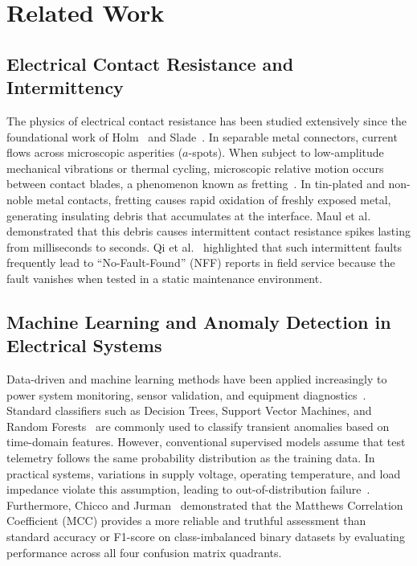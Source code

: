 \documentclass[conference]{IEEEtran}
\begin{document}
\section{Related Work}
\subsection{Electrical Contact Resistance and Intermittency}
The physics of electrical contact resistance has been studied extensively since the foundational work of Holm~\cite{holm1967electric} and Slade~\cite{slade2014electrical}. In separable metal connectors, current flows across microscopic asperities ($a$-spots). When subject to low-amplitude mechanical vibrations or thermal cycling, microscopic relative motion occurs between contact blades, a phenomenon known as fretting~\cite{swingler2000degradation}. In tin-plated and non-noble metal contacts, fretting causes rapid oxidation of freshly exposed metal, generating insulating debris that accumulates at the interface. Maul et al.~\cite{maul2001intermittency} demonstrated that this debris causes intermittent contact resistance spikes lasting from milliseconds to seconds. Qi et al.~\cite{qi2008nofault} highlighted that such intermittent faults frequently lead to ``No-Fault-Found'' (NFF) reports in field service because the fault vanishes when tested in a static maintenance environment.

\subsection{Machine Learning and Anomaly Detection in Electrical Systems}
Data-driven and machine learning methods have been applied increasingly to power system monitoring, sensor validation, and equipment diagnostics~\cite{gao2015survey1, gao2015survey2, qin2012survey}. Standard classifiers such as Decision Trees, Support Vector Machines, and Random Forests~\cite{breiman2001random} are commonly used to classify transient anomalies based on time-domain features. However, conventional supervised models assume that test telemetry follows the same probability distribution as the training data. In practical systems, variations in supply voltage, operating temperature, and load impedance violate this assumption, leading to out-of-distribution failure~\cite{chandola2009anomaly, he2009learning}. Furthermore, Chicco and Jurman~\cite{chicco2020matthews} demonstrated that the Matthews Correlation Coefficient (MCC) provides a more reliable and truthful assessment than standard accuracy or F1-score on class-imbalanced binary datasets by evaluating performance across all four confusion matrix quadrants.
\end{document}
